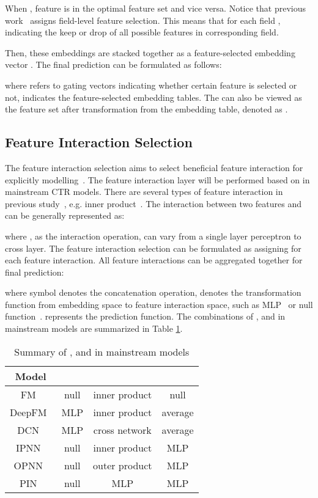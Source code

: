 \documentclass[sigconf]{acmart}
\begin{document}
When , feature  is in the optimal feature set  and vice versa. Notice that previous work~\cite{LASSO, LPFS, AutoField} assigns field-level feature selection. This means that  for each field , indicating the keep or drop of all possible features  in corresponding field. 

Then, these embeddings are stacked together as a feature-selected embedding vector . The final prediction can be formulated as follows:

where  refers to gating vectors indicating whether certain feature is selected or not,  indicates the feature-selected embedding tables. The  can also be viewed as the feature set  after transformation from the embedding table, denoted as .


\subsection{Feature Interaction Selection}
\label{sec:method_fis}

The feature interaction selection aims to select beneficial feature interaction for explicitly modelling~\cite{OptInter, AutoFIS}. The feature interaction layer will be performed based on  in mainstream CTR models. There are several types of feature interaction in previous study~\cite{AutoFeature}, e.g. inner product~\cite{DeepFM}. The interaction between two features  and  can be generally represented as:

where , as the interaction operation, can vary from a single layer perceptron to cross layer\cite{DCN}. The feature interaction selection can be formulated as assigning  for each feature interaction. All feature interactions can be aggregated together for final prediction:

where symbol  denotes the concatenation operation,  denotes the transformation function from embedding space to feature interaction space, such as MLP~\cite{DeepFM,DCN} or null function~\cite{IPNN}.  represents the prediction function. The combinations of ,  and  in mainstream models are summarized in Table \ref{Table:summary}.

\begin{table}[!htbp]
    \centering
    \caption{Summary of ,  and  in mainstream models}
    \begin{tabular}{c|c|c|c}
    \hline
        Model &  &  &  \\
    \hline
        FM~\cite{FM}            & null & inner product & null \\
DeepFM~\cite{DeepFM}    & MLP & inner product & average \\ 
        DCN~\cite{DCN}          & MLP & cross network & average \\
        IPNN~\cite{IPNN}        & null & inner product & MLP \\
        OPNN~\cite{IPNN}        & null & outer product & MLP \\
        PIN~\cite{PIN}          & null & MLP & MLP \\
    \hline
    \end{tabular}
    \label{Table:summary}
\end{table}
\end{document}
